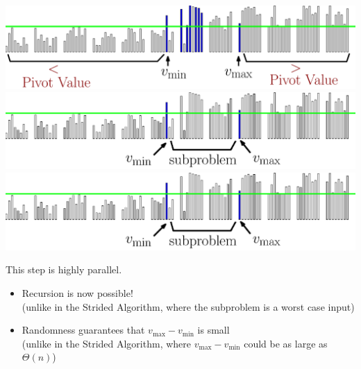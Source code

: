 \documentclass[xcolor=x11names, svgnames, rgb]{beamer}
\begin{document}
\begin{frame}[t]{}
\begin{overprint}
	\includegraphics[width=\linewidth]{imgs/smoothedStridingAlgSim/sim4.eps}
	\onslide<6>\includegraphics[width=\linewidth]{imgs/smoothedStridingAlgSim/sim45.eps}
	\onslide<7>\includegraphics[width=\linewidth]{imgs/smoothedStridingAlgSim/sim45.eps}
	\end{overprint}
	\vspace{0.25cm}
	\begin{overprint}
	This step is highly parallel.
 \begin{itemize} \item Recursion is now possible!\\
(unlike in the Strided Algorithm, where the subproblem is a worst
case input) \item Randomness guarantees
that $v_{\max} - v_{\min}$ is small \\(unlike in the Strided
Algorithm, where $v_{\max} - v_{\min}$ could be as large as $\Theta(n)$)\end{itemize} 
	\end{overprint}
\end{frame}
\end{document}
